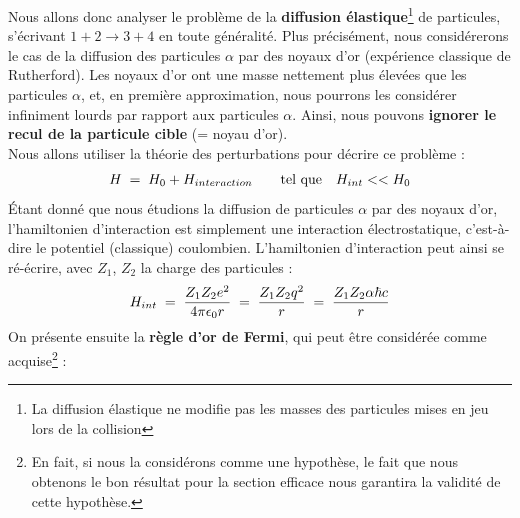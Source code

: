 Nous allons donc analyser le problème de la \textbf{diffusion élastique}\footnote{La diffusion élastique ne modifie pas les masses des particules mises en jeu lors de la collision} de particules, s'écrivant $1+2 \rightarrow 3+4$ en toute généralité. Plus précisément, nous considérerons le cas de la diffusion des particules $\alpha$ par des noyaux d'or (expérience classique de Rutherford). Les noyaux d'or ont une masse nettement plus élevées que les particules $\alpha$, et, en première approximation, nous pourrons les considérer infiniment lourds par rapport aux particules $\alpha$. Ainsi, nous pouvons \textbf{ignorer le recul de la particule cible }(= noyau d'or).\\
Nous allons utiliser la théorie des perturbations pour décrire ce problème :
\begin{equation*}
    H \; = \; H_0 + H_{interaction} \qquad \textrm{tel que} \quad H_{int} << H_0
\end{equation*}
Étant donné que nous étudions la diffusion de particules $\alpha$ par des noyaux d'or, l'hamiltonien d'interaction est simplement une interaction électrostatique, c'est-à-dire le potentiel (classique) coulombien. L'hamiltonien d'interaction peut ainsi se ré-écrire, avec $Z_1$, $Z_2$ la charge des particules :
\begin{equation*}
    H_{int} \; = \; 
    \dfrac{Z_1 Z_2 e^2}{4\pi \epsilon_0 r} 
    \; = \; \dfrac{Z_1 Z_2 q^2}{r} 
    \; = \; \dfrac{Z_1 Z_2 \alpha \hbar c}{r}
\end{equation*}
On présente ensuite la \textbf{règle d'or de Fermi}, qui peut être considérée comme acquise\footnote{En fait, si nous la considérons comme une hypothèse, le fait que nous obtenons le bon résultat pour la section efficace nous garantira la validité de cette hypothèse.} :\\
\vspace{.2cm}

